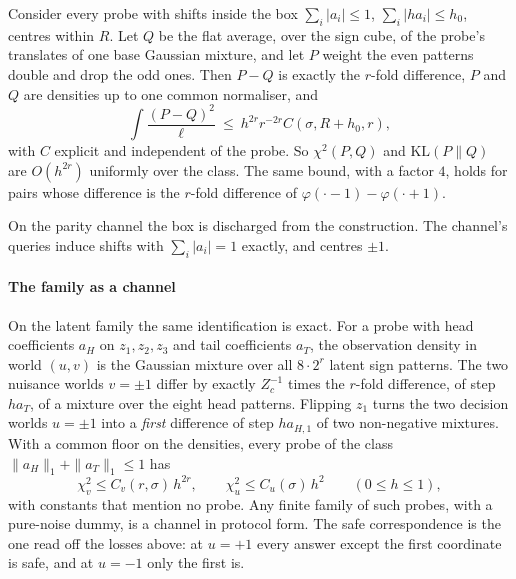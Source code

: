 \begin{theorem}
\label{thm:unif}
Consider every probe with shifts inside the box $\sum_{i}|a_{i}|\le1$, $\sum_{i}|ha_{i}|\le h_{0}$,
centres within $R$. Let $Q$ be the flat average, over the sign cube, of the probe's translates
of one base Gaussian mixture, and let $P$ weight the even patterns double and drop the odd
ones. Then $P-Q$ is exactly the $r$-fold difference, $P$ and $Q$ are densities up to one common
normaliser, and
\[
\int\frac{(P-Q)^{2}}{\ell}\ \le\ h^{2r}r^{-2r}C(\sigma,R+h_{0},r),
\]
with $C$ explicit and independent of the probe. So $\chi^{2}(P,Q)$ and $\mathrm{KL}(P\|Q)$ are
$O(h^{2r})$ uniformly over the class. The same bound, with a factor $4$, holds for pairs whose
difference is the $r$-fold difference of $\varphi(\cdot-1)-\varphi(\cdot+1)$.
\end{theorem}


On the parity channel the box is discharged from the construction. The channel's queries
induce shifts with $\sum_{i}|a_{i}|=1$ exactly, and centres $\pm1$.


\paragraph{The family as a channel} On the latent family the same identification is exact. For
a probe with head coefficients $a_{H}$ on $z_{1},z_{2},z_{3}$ and tail coefficients $a_{T}$, the
observation density in world $(u,v)$ is the Gaussian mixture over all $8\cdot2^{r}$ latent sign
patterns. The two nuisance worlds $v=\pm1$ differ by exactly
$Z_{c}^{-1}$ times the $r$-fold difference, of step $ha_{T}$, of a mixture over the eight head
patterns. Flipping $z_{1}$ turns the two decision worlds $u=\pm1$ into a \emph{first}
difference of step $h a_{H,1}$ of two non-negative mixtures. With a common floor on the
densities, every probe of the class $\|a_{H}\|_{1}+\|a_{T}\|_{1}\le1$ has
\[
\chi^{2}_{v}\le C_{v}(r,\sigma)\,h^{2r},\qquad \chi^{2}_{u}\le C_{u}(\sigma)\,h^{2}
\qquad(0\le h\le1),
\]
with constants that mention no probe. Any finite family of such probes, with a pure-noise dummy,
is a channel in protocol form. The safe correspondence is the one read off the losses above:
at $u=+1$ every answer except the first coordinate is safe, and at $u=-1$ only the first is.

